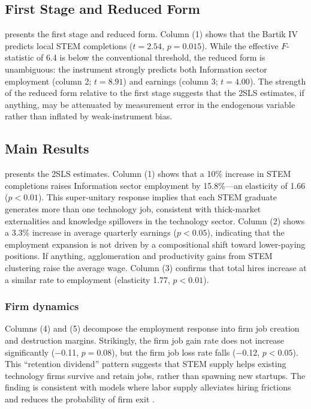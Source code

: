 \documentclass[12pt]{article}
\begin{document}
\subsection{First Stage and Reduced Form}



 presents the first stage and reduced form. Column (1) shows that the Bartik IV predicts local STEM completions ($t = 2.54$, $p = 0.015$). While the effective $F$-statistic of 6.4 is below the conventional threshold, the reduced form is unambiguous: the instrument strongly predicts both Information sector employment (column 2; $t = 8.91$) and earnings (column 3; $t = 4.00$). The strength of the reduced form relative to the first stage suggests that the 2SLS estimates, if anything, may be attenuated by measurement error in the endogenous variable rather than inflated by weak-instrument bias.

\subsection{Main Results}



 presents the 2SLS estimates. Column (1) shows that a 10\% increase in STEM completions raises Information sector employment by 15.8\%---an elasticity of 1.66 ($p < 0.01$). This super-unitary response implies that each STEM graduate generates more than one technology job, consistent with thick-market externalities and knowledge spillovers in the technology sector. Column (2) shows a 3.3\% increase in average quarterly earnings ($p < 0.05$), indicating that the employment expansion is not driven by a compositional shift toward lower-paying positions. If anything, agglomeration and productivity gains from STEM clustering raise the average wage. Column (3) confirms that total hires increase at a similar rate to employment (elasticity 1.77, $p < 0.01$).

\subsubsection*{Firm dynamics} Columns (4) and (5) decompose the employment response into firm job creation and destruction margins. Strikingly, the firm job gain rate does not increase significantly ($-$0.11, $p = 0.08$), but the firm job loss rate falls ($-$0.12, $p < 0.05$). This ``retention dividend'' pattern suggests that STEM supply helps existing technology firms survive and retain jobs, rather than spawning new startups. The finding is consistent with models where labor supply alleviates hiring frictions and reduces the probability of firm exit \citep{haltiwanger2013creates}.
\end{document}
